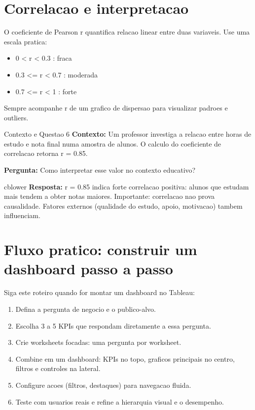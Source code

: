 \section{Correlacao e interpretacao}

O coeficiente de Pearson r quantifica relacao linear entre duas variaveis. Use uma escala pratica:
\begin{itemize}
  \item 0 < r < 0.3 : fraca
  \item 0.3 <= r < 0.7 : moderada
  \item 0.7 <= r < 1 : forte
\end{itemize}

Sempre acompanhe r de um grafico de dispersao para visualizar padroes e outliers.

\begin{SolvedBox}{Contexto e Questao 6}
	\textbf{Contexto:} Um professor investiga a relacao entre horas de estudo e nota final numa amostra de alunos. O calculo do coeficiente de correlacao retorna r = 0.85.

	\textbf{Pergunta:} Como interpretar esse valor no contexto educativo?

	cblower
	\textbf{Resposta:} r = 0.85 indica forte correlacao positiva: alunos que estudam mais tendem a obter notas maiores. Importante: correlacao nao prova causalidade. Fatores externos (qualidade do estudo, apoio, motivacao) tambem influenciam.
\end{SolvedBox}

\section{Fluxo pratico: construir um dashboard passo a passo}

Siga este roteiro quando for montar um dashboard no Tableau:
\begin{enumerate}
  \item Defina a pergunta de negocio e o publico-alvo.
  \item Escolha 3 a 5 KPIs que respondam diretamente a essa pergunta.
  \item Crie worksheets focadas: uma pergunta por worksheet.
  \item Combine em um dashboard: KPIs no topo, graficos principais no centro, filtros e controles na lateral.
  \item Configure acoes (filtros, destaques) para navegacao fluida.
  \item Teste com usuarios reais e refine a hierarquia visual e o desempenho.
\end{enumerate}


